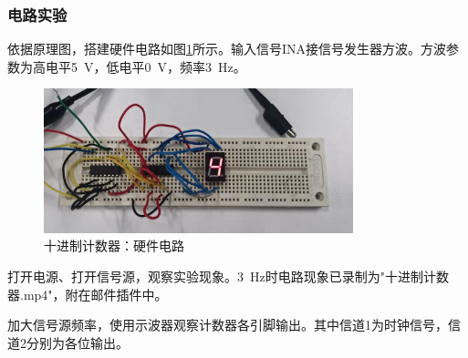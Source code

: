 \documentclass[UTF8]{ctexart}
\numberwithin{figure}{subsection}
\numberwithin{table}{subsection}
\numberwithin{equation}{subsection}
\begin{document}
\subsubsection{电路实验}
\par 依据原理图，搭建硬件电路如图\ref{10 cir}所示。输入信号INA接信号发生器方波。方波参数为高电平\SI{5}{\volt}，低电平\SI{0}{\volt}，频率\SI{3}{\hertz}。

\begin{figure}[H]
    \begin{center}
        \includegraphics[width=0.8\textwidth]{10/circuit.jpg}
    \end{center}
    \caption{十进制计数器：硬件电路}
    \label{10 cir}
\end{figure}

\par 打开电源、打开信号源，观察实验现象。\SI{3}{\hertz}时电路现象已录制为"十进制计数器.mp4"，附在邮件插件中。
\par 加大信号源频率，使用示波器观察计数器各引脚输出。其中信道1为时钟信号，信道2分别为各位输出。
\end{document}
